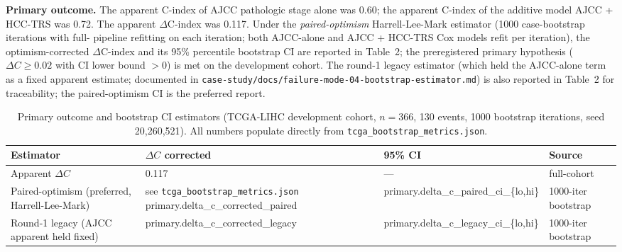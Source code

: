 \documentclass[12pt]{article}
\newcommand{\HCCRTS}{HCC-TRS\xspace}
\begin{document}
\textbf{Primary outcome.}
The apparent C-index of AJCC pathologic stage alone was 0.60; the
apparent C-index of the additive model AJCC + \HCCRTS was 0.72. The
apparent $\Delta$C-index was 0.117. Under the \emph{paired-optimism}
Harrell-Lee-Mark estimator (1000 case-bootstrap iterations with full-
pipeline refitting on each iteration; both AJCC-alone and AJCC + \HCCRTS
Cox models refit per iteration), the optimism-corrected $\Delta$C-index
and its 95\% percentile bootstrap CI are reported in Table~2; the
preregistered primary hypothesis ($\Delta C \geq 0.02$ with CI lower
bound $> 0$) is met on the development cohort. The round-1 legacy
estimator (which held the AJCC-alone term as a fixed apparent
estimate; documented in
\texttt{case-study/docs/failure-mode-04-bootstrap-estimator.md}) is
also reported in Table~2 for traceability; the paired-optimism CI is
the preferred report.

\begin{table}[h!]
\centering
\caption{Primary outcome and bootstrap CI estimators
(TCGA-LIHC development cohort, $n = 366$, 130 events, 1000 bootstrap
iterations, seed 20{,}260{,}521). All numbers populate directly from
\texttt{tcga\_bootstrap\_metrics.json}.}
\label{tab:primary}
\begin{tabularx}{\linewidth}{X l l l}
\toprule
\textbf{Estimator}                            & \textbf{$\Delta C$ corrected} & \textbf{95\% CI} & \textbf{Source} \\
\midrule
Apparent $\Delta C$                           & 0.117                          & ---              & full-cohort \\
Paired-optimism (preferred, Harrell-Lee-Mark) & see \texttt{tcga\_bootstrap\_metrics.json} primary.delta\_c\_corrected\_paired & primary.delta\_c\_paired\_ci\_\{lo,hi\} & 1000-iter bootstrap \\
Round-1 legacy (AJCC apparent held fixed)     & primary.delta\_c\_corrected\_legacy & primary.delta\_c\_legacy\_ci\_\{lo,hi\} & 1000-iter bootstrap \\
\bottomrule
\end{tabularx}
\end{table}
\end{document}
